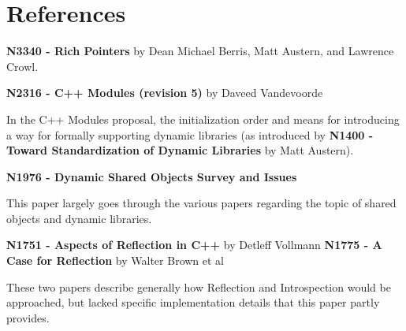 \section{References}
\textbf{N3340 - Rich Pointers} by Dean Michael Berris, Matt Austern, and Lawrence Crowl.

\textbf{N2316 - C++ Modules (revision 5)} by Daveed Vandevoorde

In the C++ Modules proposal, the initialization order and means for
introducing a way for formally supporting dynamic libraries (as introduced by
\textbf{N1400 - Toward Standardization of Dynamic Libraries} by Matt Austern).

\textbf{N1976 - Dynamic Shared Objects Survey and Issues}

This paper largely goes through the various papers regarding the topic of
shared objects and dynamic libraries.

\textbf{N1751 - Aspects of Reflection in C++} by Detleff Vollmann
\textbf{N1775 - A Case for Reflection} by Walter Brown et al

These two papers describe generally how Reflection and Introspection would be
approached, but lacked specific implementation details that this paper partly
provides.




